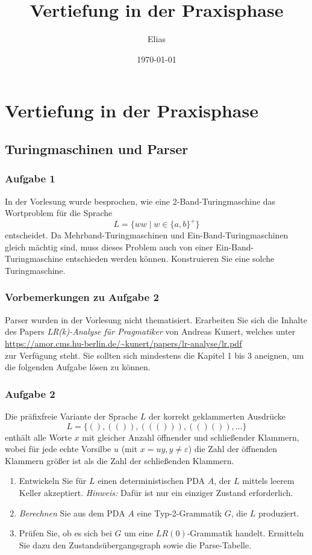 \documentclass[a4paper,14pt,ngerman]{scrartcl}
\author{Elias}
\date{\today}
\title{Vertiefung in der Praxisphase}
\begin{document}
\section{\textbf{Vertiefung in der Praxisphase}}
\label{sec:orgc0a2988}
\subsection{\textbf{Turingmaschinen und Parser}}
\label{sec:org35055a2}
\subsubsection{\textbf{Aufgabe 1}}
\label{sec:org21c5d60}

In der Vorlesung wurde besprochen, wie eine 2-Band-Turingmaschine das
Wortproblem für die Sprache \[L=\{ww \mid w \in \{a,b\}^+\}\]
entscheidet. Da Mehrband-Turingmaschinen und Ein-Band-Turingmaschinen
gleich mächtig sind, muss dieses Problem auch von einer
Ein-Band-Turingmaschine entschieden werden können. Konstruieren Sie eine
solche Turingmaschine.
\subsubsection{\textbf{Vorbemerkungen zu Aufgabe 2}}
\label{sec:orgc193ebd}

Parser wurden in der Vorlesung nicht thematisiert. Erarbeiten Sie sich
die Inhalte des Papers \emph{LR(k)-Analyse für Pragmatiker} von Andreas
Kunert, welches unter\\
\url{https://amor.cms.hu-berlin.de/\~kunert/papers/lr-analyse/lr.pdf}\\
zur Verfügung steht. Sie sollten sich mindestens die Kapitel 1 bis 3
aneignen, um die folgenden Aufgabe lösen zu können.
\subsubsection{\textbf{Aufgabe 2}}
\label{sec:org4d5f754}

Die präfixfreie Variante der Sprache \(L\) der korrekt geklammerten
Ausdrücke \[L=\{(), (()), ((())), (()()), \ldots\}\] enthält alle Worte
\(x\) mit gleicher Anzahl öffnender und schließender Klammern, wobei für
jede echte Vorsilbe \(u\) (mit \(x=uy, y\neq\varepsilon\)) die Zahl der
öffnenden Klammern größer ist als die Zahl der schließenden Klammern.

\begin{enumerate}
\item Entwickeln Sie für \(L\) einen deterministischen PDA \(A\), der \(L\)
mittels leerem Keller akzeptiert. \emph{Hinweis:} Dafür ist nur ein
einziger Zustand erforderlich.

\item \emph{Berechnen} Sie aus dem PDA \(A\) eine Typ-2-Grammatik \(G\), die
\(L\) produziert.

\item Prüfen Sie, ob es sich bei \(G\) um eine \(LR(0)\)-Grammatik handelt.
Ermitteln Sie dazu den Zustandsübergangsgraph sowie die
Parse-Tabelle.
\end{enumerate}
\end{document}
